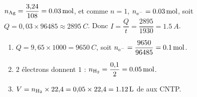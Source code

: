 \documentclass[11pt,a4paper]{article}
\begin{document}
\begin{corrige}
$n_{\ce{Ag}}=\dfrac{3{,}24}{108}=\qty{0.03}{mol}$, et comme $n=1$, $n_{\ce{e^-}}=\qty{0.03}{mol}$, soit
$Q=0{,}03\times 96485\approx\qty{2895}{C}$. Donc $I=\dfrac{Q}{t}=\dfrac{2895}{1930}=\qty{1.5}{A}$.
\end{corrige}

\begin{corrige}
\begin{enumerate}[label=\alph*)]
  \item $Q=9{,}65\times 1000=\qty{9650}{C}$, soit $n_{\ce{e^-}}=\dfrac{9650}{96485}=\qty{0.1}{mol}$.
  \item $2$ électrons donnent $1$  : $n_{\ce{H2}}=\dfrac{0{,}1}{2}=\qty{0.05}{mol}$.
  \item $V=n_{\ce{H2}}\times 22{,}4=0{,}05\times 22{,}4=\qty{1.12}{L}$ de  aux CNTP.
\end{enumerate}
\end{corrige}
\end{document}
